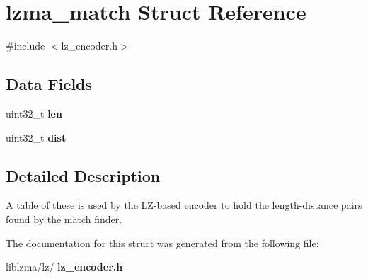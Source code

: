 \section{lzma\+\_\+match Struct Reference}
\label{structlzma__match}


{\ttfamily \#include $<$lz\+\_\+encoder.\+h$>$}

\subsection*{Data Fields}
\begin{DoxyCompactItemize}
\item 
\mbox{\label{structlzma__match_a83e144a036dc055ac6d68dfd3b17f9fc}} 
uint32\+\_\+t {\bfseries len}
\item 
\mbox{\label{structlzma__match_aca321e5f1e0f297dbd80e1301b0a6ccc}} 
uint32\+\_\+t {\bfseries dist}
\end{DoxyCompactItemize}


\subsection{Detailed Description}
A table of these is used by the L\+Z-\/based encoder to hold the length-\/distance pairs found by the match finder. 

The documentation for this struct was generated from the following file\+:\begin{DoxyCompactItemize}
\item 
liblzma/lz/\textbf{ lz\+\_\+encoder.\+h}\end{DoxyCompactItemize}

